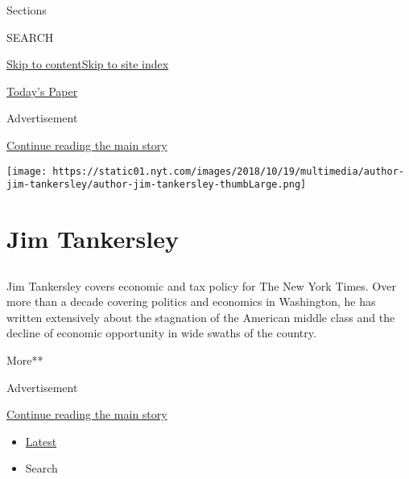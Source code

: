 Sections

SEARCH

\protect\hyperlink{site-content}{Skip to
content}\protect\hyperlink{site-index}{Skip to site index}

\href{https://myaccount.nytimes.com/auth/login?response_type=cookie\&client_id=vi}{}

\href{https://www.nytimes.com/section/todayspaper}{Today's Paper}

Advertisement

\protect\hyperlink{after-top}{Continue reading the main story}

\texttt{[image: https://static01.nyt.com/images/2018/10/19/multimedia/author-jim-tankersley/author-jim-tankersley-thumbLarge.png]}

\hypertarget{jim-tankersley}{%
\section{Jim Tankersley}\label{jim-tankersley}}

\hypertarget{section}{%
\subsection{}\label{section}}

Jim Tankersley covers economic and tax policy for The New York Times.
Over more than a decade covering politics and economics in Washington,
he has written extensively about the stagnation of the American middle
class and the decline of economic opportunity in wide swaths of the
country.

More**

Advertisement

\protect\hyperlink{after-mid1}{Continue reading the main story}

\begin{itemize}
\tightlist
\item
  \protect\hyperlink{stream-panel}{Latest}
\item
  Search
\end{itemize}

